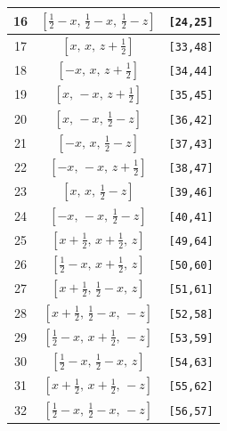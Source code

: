 \documentclass[fleqn,8pt]{jsarticle}
\begin{document}
\begin{longtable}{ccc}
16 & $\left[ \frac{1}{2} - x,\, \frac{1}{2} - x,\, \frac{1}{2} - z \right]$ & {\tt [24,25]} \\ \hline
17 & $\left[ x,\, x,\, z + \frac{1}{2} \right]$ & {\tt [33,48]} \\ \hline
18 & $\left[ - x,\, x,\, z + \frac{1}{2} \right]$ & {\tt [34,44]} \\ \hline
19 & $\left[ x,\, - x,\, z + \frac{1}{2} \right]$ & {\tt [35,45]} \\ \hline
20 & $\left[ x,\, - x,\, \frac{1}{2} - z \right]$ & {\tt [36,42]} \\ \hline
21 & $\left[ - x,\, x,\, \frac{1}{2} - z \right]$ & {\tt [37,43]} \\ \hline
22 & $\left[ - x,\, - x,\, z + \frac{1}{2} \right]$ & {\tt [38,47]} \\ \hline
23 & $\left[ x,\, x,\, \frac{1}{2} - z \right]$ & {\tt [39,46]} \\ \hline
24 & $\left[ - x,\, - x,\, \frac{1}{2} - z \right]$ & {\tt [40,41]} \\ \hline
25 & $\left[ x + \frac{1}{2},\, x + \frac{1}{2},\, z \right]$ & {\tt [49,64]} \\ \hline
26 & $\left[ \frac{1}{2} - x,\, x + \frac{1}{2},\, z \right]$ & {\tt [50,60]} \\ \hline
27 & $\left[ x + \frac{1}{2},\, \frac{1}{2} - x,\, z \right]$ & {\tt [51,61]} \\ \hline
28 & $\left[ x + \frac{1}{2},\, \frac{1}{2} - x,\, - z \right]$ & {\tt [52,58]} \\ \hline
29 & $\left[ \frac{1}{2} - x,\, x + \frac{1}{2},\, - z \right]$ & {\tt [53,59]} \\ \hline
30 & $\left[ \frac{1}{2} - x,\, \frac{1}{2} - x,\, z \right]$ & {\tt [54,63]} \\ \hline
31 & $\left[ x + \frac{1}{2},\, x + \frac{1}{2},\, - z \right]$ & {\tt [55,62]} \\ \hline
32 & $\left[ \frac{1}{2} - x,\, \frac{1}{2} - x,\, - z \right]$ & {\tt [56,57]} \\
\end{longtable}
\renewcommand{\arraystretch}{1.2}
\end{document}
